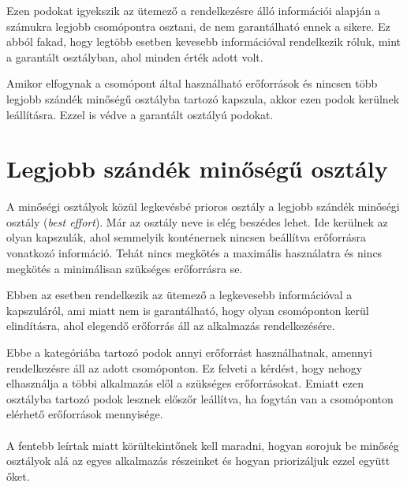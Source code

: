 Ezen podokat igyekszik az ütemező a rendelkezésre álló információi alapján a számukra legjobb csomópontra osztani, de nem garantálható ennek a sikere.
Ez abból fakad, hogy legtöbb esetben kevesebb információval rendelkezik róluk, mint a garantált osztályban, ahol minden érték adott volt.

Amikor elfogynak a csomópont által használható erőforrások és nincsen több legjobb szándék minőségű osztályba tartozó kapszula, akkor ezen podok kerülnek leállításra. 
Ezzel is védve a garantált osztályú podokat.

\section{Legjobb szándék minőségű osztály}

A minőségi osztályok közül legkevésbé prioros osztály a legjobb szándék minőségi osztály (\textit{best effort}).
Már az osztály neve is elég beszédes lehet.
Ide kerülnek az olyan kapszulák, ahol semmelyik konténernek nincsen beállítva erőforrásra vonatkozó információ.
Tehát nincs megkötés a maximális használatra és nincs megkötés a minimálisan szükséges erőforrásra se.

Ebben az esetben rendelkezik az ütemező a legkevesebb információval a kapszuláról, ami miatt nem is garantálható, hogy olyan csomóponton kerül elindításra, ahol elegendő erőforrás áll az alkalmazás rendelkezésére.

Ebbe a kategóriába tartozó podok annyi erőforrást használhatnak, amennyi rendelkezésre áll az adott csomóponton.
Ez felveti a kérdést, hogy nehogy elhasználja a többi alkalmazás elől a szükséges erőforrásokat.
Emiatt ezen osztályba tartozó podok lesznek előszőr leállítva, ha fogytán van a csomóponton elérhető erőforrások mennyisége.
\\
\\
A fentebb leírtak miatt körültekintőnek kell maradni, hogyan sorojuk be minőség osztályok alá az egyes alkalmazás részeinket és hogyan priorizáljuk ezzel együtt őket. 
